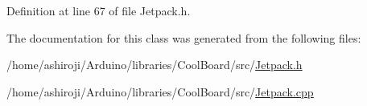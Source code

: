 Definition at line 67 of file Jetpack.\+h.



The documentation for this class was generated from the following files\+:\begin{DoxyCompactItemize}
\item 
/home/ashiroji/\+Arduino/libraries/\+Cool\+Board/src/\hyperlink{_jetpack_8h}{Jetpack.\+h}\item 
/home/ashiroji/\+Arduino/libraries/\+Cool\+Board/src/\hyperlink{_jetpack_8cpp}{Jetpack.\+cpp}\end{DoxyCompactItemize}

